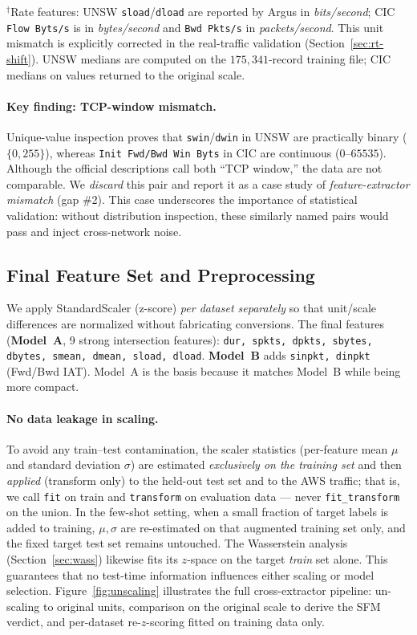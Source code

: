 \documentclass[preprint,12pt,authoryear]{elsarticle}
\begin{document}
\begin{table}[t]
\vspace{0.4em}
\raggedright{\footnotesize $^\dagger$Rate features: UNSW \texttt{sload}/\texttt{dload}
are reported by Argus in \emph{bits/second}; CIC \texttt{Flow Byts/s} is in
\emph{bytes/second} and \texttt{Bwd Pkts/s} in \emph{packets/second}. This unit
mismatch is explicitly corrected in the real-traffic validation
(Section~\ref{sec:rt-shift}). UNSW medians are computed on the $175{,}341$-record
training file; CIC medians on values returned to the original scale.}
\end{table}

\paragraph{Key finding: TCP-window mismatch.} Unique-value inspection proves that
\texttt{swin}/\texttt{dwin} in UNSW are practically binary ($\{0, 255\}$), whereas
\texttt{Init Fwd/Bwd Win Byts} in CIC are continuous ($0$--$65535$). Although the
official descriptions call both ``TCP window,'' the data are not comparable. We
\emph{discard} this pair and report it as a case study of \emph{feature-extractor
mismatch} (gap \#2). This case underscores the importance of statistical
validation: without distribution inspection, these similarly named pairs would
pass and inject cross-network noise.

\subsection{Final Feature Set and Preprocessing}
We apply StandardScaler (z-score) \emph{per dataset separately} so that
unit/scale differences are normalized without fabricating conversions. The final
features (\textbf{Model~A}, 9 strong intersection features): \texttt{dur, spkts,
dpkts, sbytes, dbytes, smean, dmean, sload, dload}. \textbf{Model~B} adds
\texttt{sinpkt, dinpkt} (Fwd/Bwd IAT). Model~A is the basis because it matches
Model~B while being more compact.

\paragraph{No data leakage in scaling.} To avoid any train--test contamination,
the scaler statistics (per-feature mean $\mu$ and standard deviation $\sigma$) are
estimated \emph{exclusively on the training set} and then \emph{applied} (transform
only) to the held-out test set and to the AWS traffic; that is, we call
\texttt{fit} on train and \texttt{transform} on evaluation data --- never
\texttt{fit\_transform} on the union. In the few-shot setting, when a small
fraction of target labels is added to training, $\mu,\sigma$ are re-estimated on
that augmented training set only, and the fixed target test set remains untouched.
The Wasserstein analysis (Section~\ref{sec:wass}) likewise fits its $z$-space on
the target \emph{train} set alone. This guarantees that no test-time information
influences either scaling or model selection. Figure~\ref{fig:unscaling}
illustrates the full cross-extractor pipeline: un-scaling to original units,
comparison on the original scale to derive the SFM verdict, and per-dataset
re-$z$-scoring fitted on training data only.
\end{document}
